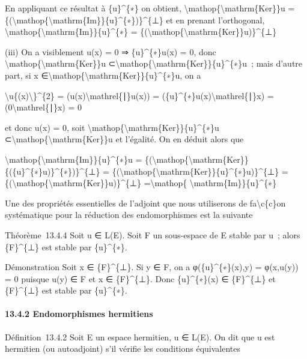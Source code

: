 \documentclass[]{article}
\begin{document}
En appliquant ce résultat à \{u\}\^{}\{∗\} on obtient,
\textbackslash{}mathop\{\textbackslash{}mathrm\{Ker\}\}u =
\{(\textbackslash{}mathop\{\textbackslash{}mathrm\{Im\}\}\{u\}\^{}\{∗\})\}\^{}\{⊥\}
et en prenant l'orthogonal,
\textbackslash{}mathop\{\textbackslash{}mathrm\{Im\}\}\{u\}\^{}\{∗\} =
\{(\textbackslash{}mathop\{\textbackslash{}mathrm\{Ker\}\}u)\}\^{}\{⊥\}

(iii) On a visiblement u(x) = 0 ⇒ \{u\}\^{}\{∗\}u(x) = 0, donc
\textbackslash{}mathop\{\textbackslash{}mathrm\{Ker\}\}u
⊂\textbackslash{}mathop\{\textbackslash{}mathrm\{Ker\}\}\{u\}\^{}\{∗\}u~;
mais d'autre part, si x
∈\textbackslash{}mathop\{\textbackslash{}mathrm\{Ker\}\}\{u\}\^{}\{∗\}u,
on a

\textbackslash{}\textbar{}u\{(x)\textbackslash{}\textbar{}\}\^{}\{2\} =
(u(x)\textbackslash{}mathrel\{∣\}u(x)) =
(\{u\}\^{}\{∗\}u(x)\textbackslash{}mathrel\{∣\}x) =
(0\textbackslash{}mathrel\{∣\}x) = 0

et donc u(x) = 0, soit
\textbackslash{}mathop\{\textbackslash{}mathrm\{Ker\}\}\{u\}\^{}\{∗\}u
⊂\textbackslash{}mathop\{\textbackslash{}mathrm\{Ker\}\}u et l'égalité.
On en déduit alors que

\textbackslash{}mathop\{\textbackslash{}mathrm\{Im\}\}\{u\}\^{}\{∗\}u =
\{(\textbackslash{}mathop\{\textbackslash{}mathrm\{Ker\}\}\{(\{u\}\^{}\{∗\}u)\}\^{}\{∗\})\}\^{}\{⊥\}
=
\{(\textbackslash{}mathop\{\textbackslash{}mathrm\{Ker\}\}\{u\}\^{}\{∗\}u)\}\^{}\{⊥\}
=
\{(\textbackslash{}mathop\{\textbackslash{}mathrm\{Ker\}\}u)\}\^{}\{⊥\}
=\textbackslash{}mathop\{ \textbackslash{}mathrm\{Im\}\}\{u\}\^{}\{∗\}

Une des propriétés essentielles de l'adjoint que nous utiliserons de
fa\textbackslash{}c\{c\}on systématique pour la réduction des
endomorphismes est la suivante

Théorème~13.4.4 Soit u ∈ L(E). Soit F un sous-espace de E stable par u~;
alors \{F\}\^{}\{⊥\} est stable par \{u\}\^{}\{∗\}.

Démonstration Soit x ∈ \{F\}\^{}\{⊥\}. Si y ∈ F, on a
φ(\{u\}\^{}\{∗\}(x),y) = φ(x,u(y)) = 0 puisque u(y) ∈ F et x ∈
\{F\}\^{}\{⊥\}. Donc \{u\}\^{}\{∗\}(x) ∈ \{F\}\^{}\{⊥\} et
\{F\}\^{}\{⊥\} est stable par \{u\}\^{}\{∗\}.

\paragraph{13.4.2 Endomorphismes hermitiens}

Définition~13.4.2 Soit E un espace hermitien, u ∈ L(E). On dit que u est
hermitien (ou autoadjoint) s'il vérifie les conditions équivalentes
\end{document}
